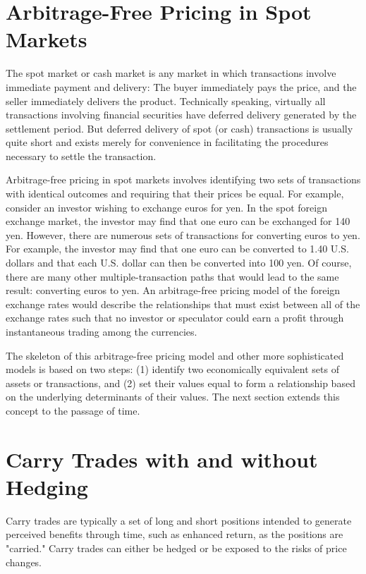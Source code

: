 \documentclass[11pt]{article}
\begin{document}
\section*{Arbitrage-Free Pricing in Spot Markets}
The spot market or cash market is any market in which transactions involve immediate payment and delivery: The buyer immediately pays the price, and the seller immediately delivers the product. Technically speaking, virtually all transactions involving financial securities have deferred delivery generated by the settlement period. But deferred delivery of spot (or cash) transactions is usually quite short and exists merely for convenience in facilitating the procedures necessary to settle the transaction.

Arbitrage-free pricing in spot markets involves identifying two sets of transactions with identical outcomes and requiring that their prices be equal. For example, consider an investor wishing to exchange euros for yen. In the spot foreign exchange market, the investor may find that one euro can be exchanged for 140 yen. However, there are numerous sets of transactions for converting euros to yen. For example, the investor may find that one euro can be converted to 1.40 U.S. dollars and that each U.S. dollar can then be converted into 100 yen. Of course, there are many other multiple-transaction paths that would lead to the same result: converting euros to yen. An arbitrage-free pricing model of the foreign exchange rates would describe the relationships that must exist between all of the exchange rates such that no investor or speculator could earn a profit through instantaneous trading among the currencies.

The skeleton of this arbitrage-free pricing model and other more sophisticated models is based on two steps: (1) identify two economically equivalent sets of assets or transactions, and (2) set their values equal to form a relationship based on the underlying determinants of their values. The next section extends this concept to the passage of time.

\section*{Carry Trades with and without Hedging}
Carry trades are typically a set of long and short positions intended to generate perceived benefits through time, such as enhanced return, as the positions are "carried." Carry trades can either be hedged or be exposed to the risks of price changes.
\end{document}
